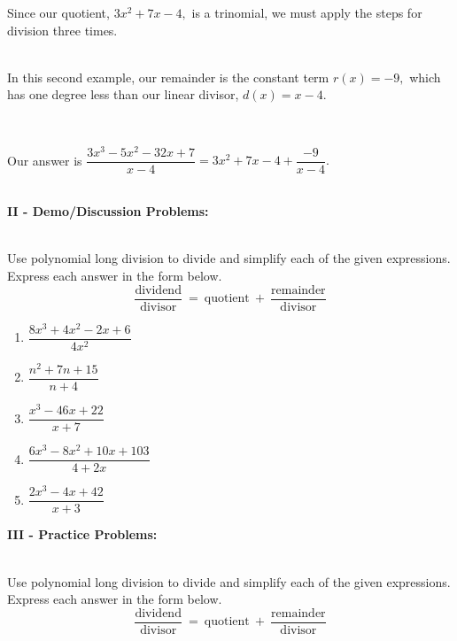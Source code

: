 \documentclass[12pt]{article}
\theoremstyle{definition}
\begin{document}
\begin{multicols}{2}

\columnbreak

Since our quotient, $3x^2+7x-4,$
is a trinomial, we must apply the steps for division three times.\\
\ \par
In this second example, our remainder is the constant term $r(x)=-9,$ which has one degree less than our linear divisor, $d(x)=x-4$.
\end{multicols}
\ \par
Our answer is $\dfrac{3x^3-5x^2-32x+7}{x-4}=3x^2+7x-4+\dfrac{-9}{x-4}.$\\
\ \par
{\bf II - Demo/Discussion Problems:}\\
\ \par
Use polynomial long division to divide and simplify each of the given expressions.  Express each answer in the form below.
$$\frac{\text{dividend}}{\text{divisor}} \ = \ \text{quotient} \ + \ \frac{\text{remainder}}{\text{divisor}}$$
\begin{enumerate}
	\item $\dfrac{8x^3+4x^2-2x+6}{4x^2}$
	\item $\dfrac{n^2 + 7 n + 15}{n + 4}$
	\item $\dfrac{x^3 - 46 x + 22}{x + 7}$
	\item $\dfrac{6x^3-8x^2+10x+103}{4+2x}$
	\item $\dfrac{2x^3-4x+42}{x+3}$
\end{enumerate}
\newpage
{\bf III - Practice Problems:}\\
\ \par
Use polynomial long division to divide and simplify each of the given expressions.  Express each answer in the form below.
$$\frac{\text{dividend}}{\text{divisor}} \ = \ \text{quotient} \ + \ \frac{\text{remainder}}{\text{divisor}}$$
\end{document}
